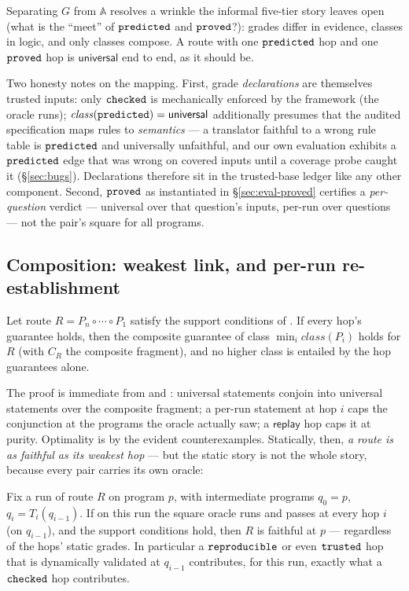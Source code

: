 Separating $G$ from $\mathbb{A}$ resolves a wrinkle the informal
five-tier story leaves open (what is the ``meet'' of $\mathtt{predicted}$ and
$\mathtt{proved}$?): grades differ in evidence, classes in logic, and only classes
compose. A route with one $\mathtt{predicted}$ hop and one $\mathtt{proved}$ hop is
$\mathsf{universal}$ end to end, as it should be.

Two honesty notes on the mapping. First, grade \emph{declarations} are
themselves trusted inputs: only $\mathtt{checked}$ is mechanically enforced by the
framework (the oracle runs); $\mathit{class}(\mathtt{predicted}) = \mathsf{universal}$
additionally presumes that the audited specification maps rules to
\emph{semantics} --- a translator faithful to a wrong rule table is
$\mathtt{predicted}$ and universally unfaithful, and our own evaluation exhibits a
$\mathtt{predicted}$ edge that was wrong on covered inputs until a coverage probe
caught it (\S\ref{sec:bugs}). Declarations therefore sit in the
trusted-base ledger like any other component. Second, $\mathtt{proved}$ as
instantiated in \S\ref{sec:eval-proved} certifies a \emph{per-question}
verdict --- universal over that question's inputs, per-run over
questions --- not the pair's square for all programs.

\subsection{Composition: weakest link, and per-run re-establishment}
\label{sec:composition}

\begin{proposition}
\label{prop:weakestlink}
Let route $R = P_n \circ \cdots \circ P_1$ satisfy the support conditions
of . If every hop's guarantee holds, then the composite
guarantee of class $\min_i \mathit{class}(P_i)$ holds for $R$ (with
$C_R$ the composite fragment), and no higher class is entailed by the
hop guarantees alone.
\end{proposition}

The proof is immediate from  and :
universal statements conjoin into universal statements over the composite
fragment; a per-run statement at hop $i$ caps the conjunction at the
programs the oracle actually saw; a $\mathsf{replay}$ hop caps it at
purity. Optimality is by the evident counterexamples. Statically, then,
\emph{a route is as faithful as its weakest hop} --- but the static story
is not the whole story, because every pair carries its own oracle:

\begin{theorem}
\label{thm:reestablish}
Fix a run of route $R$ on program $p$, with intermediate programs
$q_0 = p$, $q_i = T_i(q_{i-1})$. If on this run the square oracle runs
and passes at every hop $i$ (on $q_{i-1}$), and the support conditions
hold, then $R$ is faithful at $p$ --- regardless of the hops' static
grades. In particular a $\mathtt{reproducible}$ or even $\mathtt{trusted}$ hop that is
dynamically validated at $q_{i-1}$ contributes, for this run, exactly
what a $\mathtt{checked}$ hop contributes.
\end{theorem}

